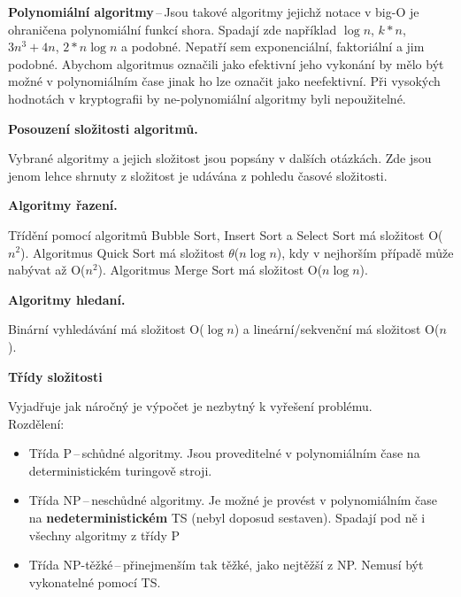 \textbf{Polynomiální algoritmy}\,--\,Jsou takové algoritmy jejichž notace v big-O je ohraničena polynomiální funkcí shora. Spadají zde například $\log{n}$, $k*n$, $3n^3 + 4n$, $2*n\log{n}$ a podobné. Nepatří sem exponenciální, faktoriální a jim podobné. Abychom algoritmus označili jako efektivní jeho vykonání by mělo být možné v polynomiálním čase jinak ho lze označit jako neefektivní. Při vysokých hodnotách v kryptografii by ne-polynomiální algoritmy byli nepoužitelné.

\begin{Large}\vspace{0,5cm} \textbf{Posouzení složitosti algoritmů.}
\end{Large}

Vybrané algoritmy a jejich složitost jsou popsány v dalších otázkách. Zde jsou jenom lehce shrnuty z složitost je udávána z pohledu časové složitosti.  

\begin{large}\vspace{0,2cm} \textbf{Algoritmy řazení.}
\end{large}

Třídění pomocí algoritmů Bubble Sort, Insert Sort a Select Sort má složitost O($n^2$). Algoritmus Quick Sort má složitost $\theta$($n\log{n}$), kdy v nejhorším případě může nabývat až O($n^2$). Algoritmus Merge Sort má složitost O($n\log{n}$).

\begin{large}\vspace{0,2cm} \textbf{Algoritmy hledaní.}
\end{large}

Binární vyhledávání má složitost O($\log{n}$) a lineární/sekvenční má složitost O($n$).


\begin{Large}\vspace{0,5cm} \textbf{Třídy složitosti}
\end{Large}

Vyjadřuje jak náročný je výpočet je nezbytný k vyřešení problému.\\
Rozdělení:
\begin{itemize}
    \item Třída P\,--\,schůdné algoritmy. Jsou proveditelné v polynomiálním čase na deterministickém turingově stroji.
    \item Třída NP\,--\,neschůdné algoritmy. Je možné je provést v polynomiálním čase na \textbf{nedeterministickém} TS (nebyl doposud sestaven). Spadají pod ně i všechny algoritmy z třídy P
    \item Třída NP-těžké\,--\,přinejmenším tak těžké, jako nejtěžší z NP. Nemusí být vykonatelné pomocí TS.
\end{itemize}


